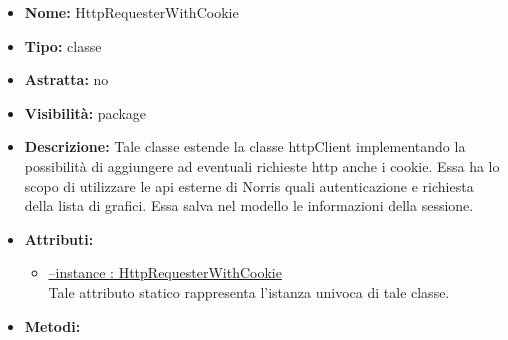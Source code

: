 			
			\begin{itemize}
			\item \textbf{Nome:} HttpRequesterWithCookie
			\item \textbf{Tipo:} classe
			
		\item \textbf{Astratta:}
		no
			\item \textbf{Visibilità:} package
			\item \textbf{Descrizione:} Tale classe estende la classe httpClient implementando la possibilità di aggiungere ad eventuali richieste http anche i cookie. Essa ha lo scopo di utilizzare le api esterne di Norris quali autenticazione e richiesta della lista di grafici. Essa salva nel modello le informazioni della sessione.
			\item \textbf{Attributi:}
				\begin{itemize}
				\setlength{\itemsep}{5pt}
				
					\item[\ding{111}] \underline{--instance : HttpRequesterWithCookie} \\ [1mm] Tale attributo statico rappresenta l'istanza univoca di tale classe.
				\end{itemize}
		
			\item \textbf{Metodi:}
				\begin{itemize}
				\setlength{\itemsep}{5pt}
				

\end{itemize}
\end{itemize}
